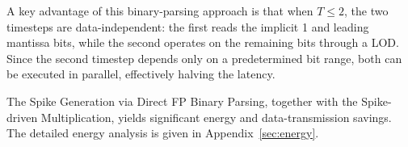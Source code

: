 A key advantage of this binary-parsing approach is that when $T \leq 2$, the two timesteps are data-independent: the first reads the implicit 1 and leading mantissa bits, while the second operates on the remaining bits through a LOD. Since the second timestep depends only on a predetermined bit range, both can be executed in parallel, effectively halving the latency.

The Spike Generation via Direct FP Binary Parsing, together with the Spike-driven Multiplication, yields significant energy and data-transmission savings. The detailed energy analysis is given in Appendix~\ref{sec:energy}.
